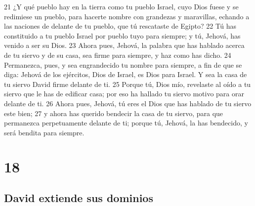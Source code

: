 21 ¿Y qué pueblo hay en la tierra como tu pueblo Israel, cuyo Dios fuese y se redimiese un pueblo, para hacerte nombre con grandezas y maravillas, echando a las naciones de delante de tu pueblo, que tú rescataste de Egipto?
22 Tú has constituido a tu pueblo Israel por pueblo tuyo para siempre; y tú, Jehová, has venido a ser su Dios.
23 Ahora pues, Jehová, la palabra que has hablado acerca de tu siervo y de su casa, sea firme para siempre, y haz como has dicho.
24 Permanezca, pues, y sea engrandecido tu nombre para siempre, a fin de que se diga: Jehová de los ejércitos, Dios de Israel, es Dios para Israel. Y sea la casa de tu siervo David firme delante de ti.
25 Porque tú, Dios mío, revelaste al oído a tu siervo que le has de edificar casa; por eso ha hallado tu siervo motivo para orar delante de ti.
26 Ahora pues, Jehová, tú eres el Dios que has hablado de tu siervo este bien;
27 y ahora has querido bendecir la casa de tu siervo, para que permanezca perpetuamente delante de ti; porque tú, Jehová, la has bendecido, y será bendita para siempre.

\chapter{18}

\section*{David extiende sus dominios}

